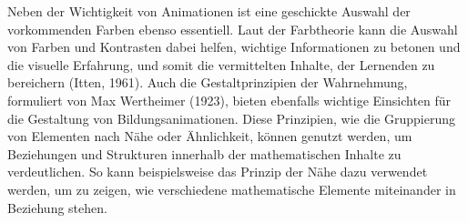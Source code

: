 Neben der Wichtigkeit von Animationen ist eine geschickte Auswahl der vorkommenden Farben ebenso essentiell. Laut der Farbtheorie kann die Auswahl von Farben und Kontrasten dabei helfen, wichtige Informationen zu betonen und die visuelle Erfahrung, und somit die vermittelten Inhalte, der Lernenden zu bereichern (Itten, 1961). Auch die Gestaltprinzipien der Wahrnehmung, formuliert von Max Wertheimer (1923), bieten ebenfalls wichtige Einsichten für die Gestaltung von Bildungsanimationen. Diese Prinzipien, wie die Gruppierung von Elementen nach Nähe oder Ähnlichkeit, können genutzt werden, um Beziehungen und Strukturen innerhalb der mathematischen Inhalte zu verdeutlichen. So kann beispielsweise das Prinzip der Nähe dazu verwendet werden, um zu zeigen, wie verschiedene mathematische Elemente miteinander in Beziehung stehen. 